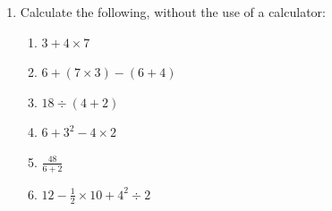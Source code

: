 \begin{enumerate}
\item Calculate the following, without the use of a calculator:
\begin{enumerate}
\item $3 + 4 \times 7$
\item $6 + (7 \times 3) - (6 + 4)$
\item $18 \div (4 + 2)$
\item $6 + 3^2 - 4 \times 2$
\item $\frac{48}{6+2}$
\item $12 - \frac{1}{2} \times 10 + 4^2 \div 2$
\end{enumerate}
\end{enumerate}

%
